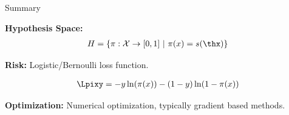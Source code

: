 \documentclass[11pt,compress,t,notes=noshow, xcolor=table]{beamer}
\begin{document}




 





\begin{frame}{Summary}

\textbf{Hypothesis Space:} 
\begin{eqnarray*}
  \Hspace = \left\{\pi: \Xspace \to [0,1] ~|~\pix = s(\thx) \right\}
\end{eqnarray*}

\lz

\textbf{Risk:} Logistic/Bernoulli loss function.

\begin{eqnarray*}
  \Lpixy = -y\ln(\pix)-(1-y)\ln(1-\pix)
\end{eqnarray*}

\lz


\textbf{Optimization:} Numerical optimization, typically gradient based methods.




\end{frame}

\endlecture
\end{document}
